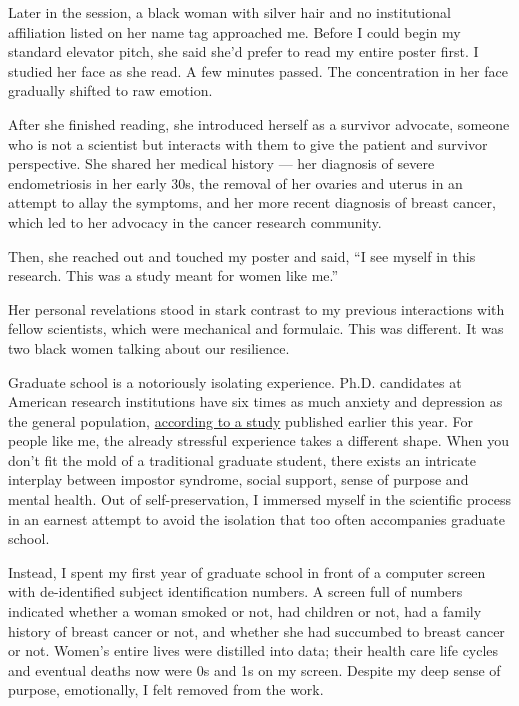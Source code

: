 Later in the session, a black woman with silver hair and no
institutional affiliation listed on her name tag approached me. Before I
could begin my standard elevator pitch, she said she'd prefer to read my
entire poster first. I studied her face as she read. A few minutes
passed. The concentration in her face gradually shifted to raw emotion.

After she finished reading, she introduced herself as a survivor
advocate, someone who is not a scientist but interacts with them to give
the patient and survivor perspective. She shared her medical history ---
her diagnosis of severe endometriosis in her early 30s, the removal of
her ovaries and uterus in an attempt to allay the symptoms, and her more
recent diagnosis of breast cancer, which led to her advocacy in the
cancer research community.

Then, she reached out and touched my poster and said, ``I see myself in
this research. This was a study meant for women like me.''

Her personal revelations stood in stark contrast to my previous
interactions with fellow scientists, which were mechanical and
formulaic. This was different. It was two black women talking about our
resilience.

Graduate school is a notoriously isolating experience. Ph.D. candidates
at American research institutions have six times as much anxiety and
depression as the general population,
\href{http://www.sciencemag.org/careers/2018/03/graduate-students-need-more-mental-health-support-new-study-highlights}{according
to a study} published earlier this year. For people like me, the already
stressful experience takes a different shape. When you don't fit the
mold of a traditional graduate student, there exists an intricate
interplay between impostor syndrome, social support, sense of purpose
and mental health. Out of self-preservation, I immersed myself in the
scientific process in an earnest attempt to avoid the isolation that too
often accompanies graduate school.

Instead, I spent my first year of graduate school in front of a computer
screen with de-identified subject identification numbers. A screen full
of numbers indicated whether a woman smoked or not, had children or not,
had a family history of breast cancer or not, and whether she had
succumbed to breast cancer or not. Women's entire lives were distilled
into data; their health care life cycles and eventual deaths now were 0s
and 1s on my screen. Despite my deep sense of purpose, emotionally, I
felt removed from the work.

